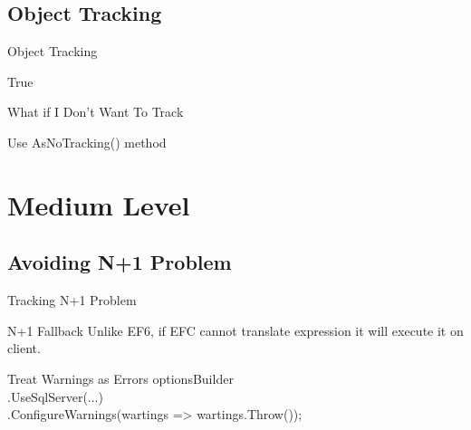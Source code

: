 \documentclass{bredelebeamer}
\begin{document}
\subsection{Object Tracking}
\begin{frame}{Object Tracking}
    
    \pause
    \begin{exampleblock}{}
        True
    \end{exampleblock}
\end{frame}

\begin{frame}{What if I Don't Want To Track}
    \begin{exampleblock}{}
        Use AsNoTracking() method
    \end{exampleblock}{}
\end{frame}

\section{Medium Level}
\subsection{Avoiding N+1 Problem}
\begin{frame}{Tracking N+1 Problem}
    \begin{alertblock}{N+1 Fallback}
        Unlike EF6, if EFC cannot translate expression it will execute it on client.
    \end{alertblock}
    \pause
    \begin{exampleblock}{Treat Warnings as Errors}
        optionsBuilder\\
                .UseSqlServer(...)\\
                .ConfigureWarnings(wartings => wartings.Throw());
    \end{exampleblock}
\end{frame}
\end{document}
